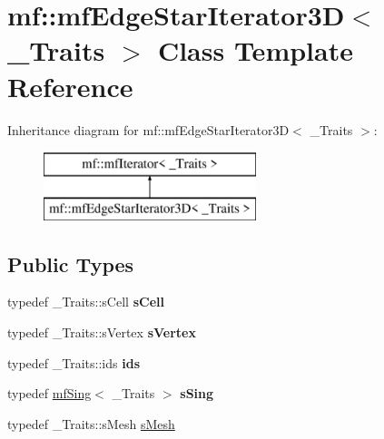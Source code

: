 \hypertarget{classmf_1_1mfEdgeStarIterator3D}{
\section{mf::mfEdgeStarIterator3D$<$ \_\-Traits $>$ Class Template Reference}
\label{classmf_1_1mfEdgeStarIterator3D}
}
Inheritance diagram for mf::mfEdgeStarIterator3D$<$ \_\-Traits $>$:\begin{figure}[H]
\begin{center}
\leavevmode
\includegraphics[height=2.000000cm]{classmf_1_1mfEdgeStarIterator3D}
\end{center}
\end{figure}
\subsection*{Public Types}
\begin{DoxyCompactItemize}
\item 
\hypertarget{classmf_1_1mfEdgeStarIterator3D_a5c76cd481f15715626ca2a2c4506f98c}{
typedef \_\-Traits::sCell {\bfseries sCell}}
\label{classmf_1_1mfEdgeStarIterator3D_a5c76cd481f15715626ca2a2c4506f98c}

\item 
\hypertarget{classmf_1_1mfEdgeStarIterator3D_ac90b77401bc37713469966adc455e26f}{
typedef \_\-Traits::sVertex {\bfseries sVertex}}
\label{classmf_1_1mfEdgeStarIterator3D_ac90b77401bc37713469966adc455e26f}

\item 
\hypertarget{classmf_1_1mfEdgeStarIterator3D_a198d164988ab98289413715bdf1c159c}{
typedef \_\-Traits::ids {\bfseries ids}}
\label{classmf_1_1mfEdgeStarIterator3D_a198d164988ab98289413715bdf1c159c}

\item 
\hypertarget{classmf_1_1mfEdgeStarIterator3D_aab9f99937505b81da093118cd53dafc0}{
typedef \hyperlink{classmf_1_1mfSing}{mfSing}$<$ \_\-Traits $>$ {\bfseries sSing}}
\label{classmf_1_1mfEdgeStarIterator3D_aab9f99937505b81da093118cd53dafc0}

\item 
typedef \_\-Traits::sMesh \hyperlink{classmf_1_1mfEdgeStarIterator3D_a875ac7316bdc779e38b0a8befde57366}{sMesh}
\end{DoxyCompactItemize}
